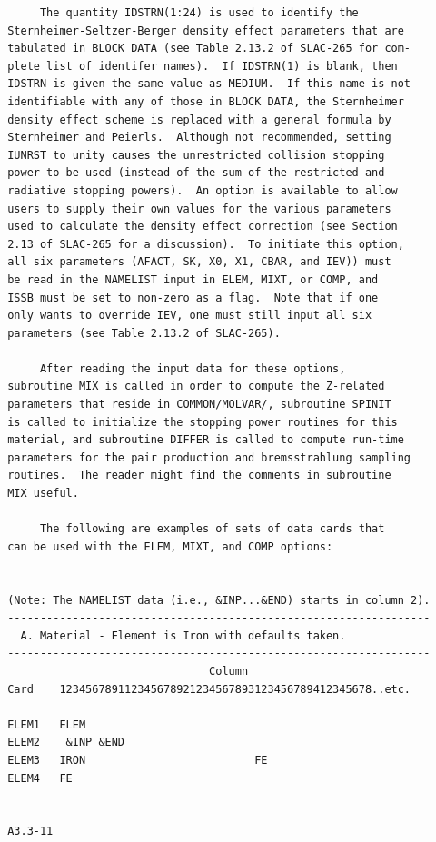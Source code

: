 \newpage \label{issb} 
  \begin{verbatim}
      The quantity IDSTRN(1:24) is used to identify the
 Sternheimer-Seltzer-Berger density effect parameters that are
 tabulated in BLOCK DATA (see Table 2.13.2 of SLAC-265 for com-
 plete list of identifer names).  If IDSTRN(1) is blank, then
 IDSTRN is given the same value as MEDIUM.  If this name is not
 identifiable with any of those in BLOCK DATA, the Sternheimer
 density effect scheme is replaced with a general formula by
 Sternheimer and Peierls.  Although not recommended, setting
 IUNRST to unity causes the unrestricted collision stopping
 power to be used (instead of the sum of the restricted and
 radiative stopping powers).  An option is available to allow
 users to supply their own values for the various parameters
 used to calculate the density effect correction (see Section
 2.13 of SLAC-265 for a discussion).  To initiate this option,
 all six parameters (AFACT, SK, X0, X1, CBAR, and IEV)) must
 be read in the NAMELIST input in ELEM, MIXT, or COMP, and
 ISSB must be set to non-zero as a flag.  Note that if one
 only wants to override IEV, one must still input all six
 parameters (see Table 2.13.2 of SLAC-265).

      After reading the input data for these options,
 subroutine MIX is called in order to compute the Z-related
 parameters that reside in COMMON/MOLVAR/, subroutine SPINIT
 is called to initialize the stopping power routines for this
 material, and subroutine DIFFER is called to compute run-time
 parameters for the pair production and bremsstrahlung sampling
 routines.  The reader might find the comments in subroutine
 MIX useful.

      The following are examples of sets of data cards that
 can be used with the ELEM, MIXT, and COMP options:


 (Note: The NAMELIST data (i.e., &INP...&END) starts in column 2).
 -----------------------------------------------------------------
   A. Material - Element is Iron with defaults taken.
 -----------------------------------------------------------------
                                Column
 Card    123456789112345678921234567893123456789412345678..etc.

 ELEM1   ELEM
 ELEM2    &INP &END
 ELEM3   IRON                          FE
 ELEM4   FE


 A3.3-11
\end{verbatim}
